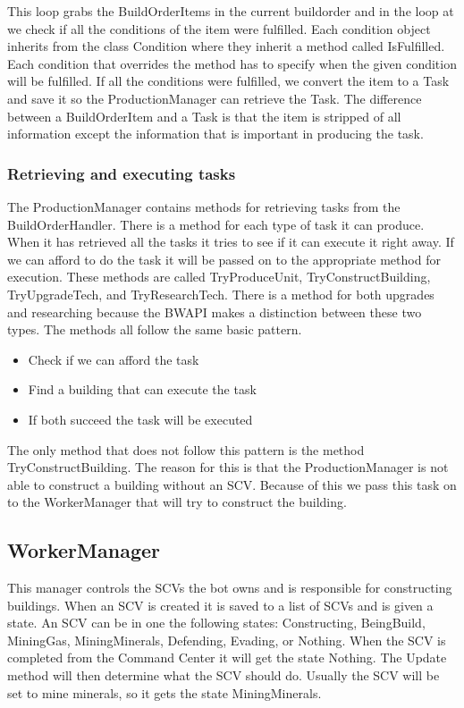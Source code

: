 			This loop grabs the BuildOrderItems in the current buildorder and in the loop at  we check if all the conditions of the item were 
			fulfilled. Each condition object inherits from the class Condition where they inherit a method called IsFulfilled. Each condition that 
			overrides the method has to specify when the given condition will be fulfilled. If all the conditions were fulfilled, we convert the 
			item to a Task and save it so the ProductionManager can retrieve the Task. The difference between a BuildOrderItem and a Task is that the 
			item is stripped of all information except the information that is important in producing the task. 
			
		\subsubsection*{Retrieving and executing tasks}
			The ProductionManager contains methods for retrieving tasks from the BuildOrderHandler. There is a method for each type of task it can 
			produce. When it has retrieved all the tasks it tries to see if it can execute it right away. 
			If we can afford to do the task it will be passed on to the appropriate method for execution. These 
			methods are called TryProduceUnit, TryConstructBuilding, TryUpgradeTech, and TryResearchTech. There is a method for both upgrades and 
			researching because the BWAPI makes a distinction between these two types. The methods all follow the same basic 
			pattern.
			\begin{itemize}
				\item Check if we can afford the task
				\item Find a building that can execute the task
				\item If both succeed the task will be executed
			\end{itemize}
			The only method that does not follow this pattern is the method TryConstructBuilding. The reason for this is that the ProductionManager is not 
			able to construct a building without an SCV. Because of this we pass this task on to the WorkerManager that will try to construct the building.
			
	\subsection{WorkerManager}
		This manager controls the SCVs the bot owns and is responsible for constructing buildings. When an SCV is created it is saved to a list of 
		SCVs and is given a state. An SCV can be in one the following states: Constructing, BeingBuild, MiningGas, MiningMinerals, Defending, Evading, or Nothing. When 
		the SCV is completed from the Command Center it will get the state Nothing. The Update method will then determine what the SCV should do. Usually 
		the SCV will be set to mine minerals, so it gets the state MiningMinerals. 
